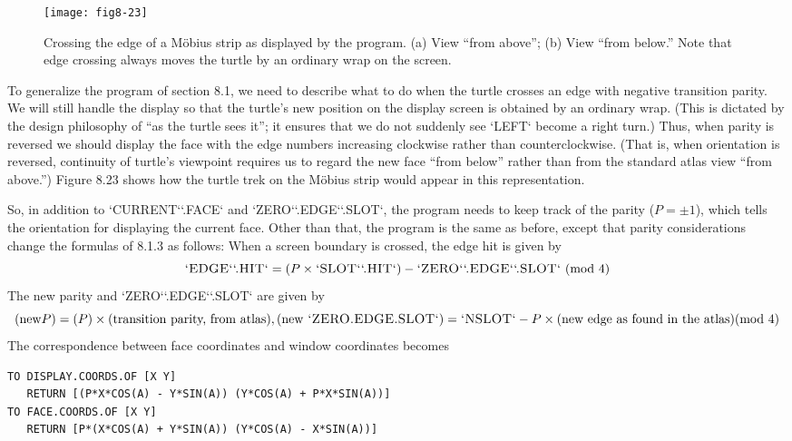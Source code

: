 \documentclass{book}
\begin{document}
\begin{figure}
\begin{center}
\texttt{[image: fig8-23]}
\caption{Crossing the edge of a M\"obius strip as displayed by the program. (a) View ``from above''; (b) View ``from below.'' Note that edge crossing always moves the turtle by an ordinary wrap on the screen.}
\end{center}
\end{figure}

To generalize the program of section 8.1, we need to describe what
to do when the turtle crosses an edge with negative transition parity.
We will still handle the display so that the turtle's new position on the
display screen is obtained by an ordinary wrap. (This is dictated by the
design philosophy of ``as the turtle sees it''; it ensures that we do not
suddenly see \textsc{`LEFT`} become a right turn.) Thus, when parity is reversed
we should display the face with the edge numbers increasing clockwise
rather than counterclockwise. (That is, when orientation is reversed,
continuity of turtle's viewpoint requires us to regard the new face ``from
below'' rather than from the standard atlas view ``from above.'') Figure
8.23 shows how the turtle trek on the M\"obius strip would appear in this
representation.

So, in addition to \textsc{`CURRENT`}\textsc{`.FACE`} and \textsc{`ZERO`}\textsc{`.EDGE`}\textsc{`.SLOT`}, the program
needs to keep track of the parity ($P = \pm 1$), which tells the orientation
for displaying the current face. Other than that, the program is the
same as before, except that parity considerations change the formulas
of 8.1.3 as follows: When a screen boundary is crossed, the edge hit is
given by
$$\text{\textsc{`EDGE`}\textsc{`.HIT`}} = (P \times \text{\textsc{`SLOT`}\textsc{`.HIT`}})- \text{\textsc{`ZERO`}\textsc{`.EDGE`}\textsc{`.SLOT`} (mod 4)}$$
The new parity and \textsc{`ZERO`}\textsc{`.EDGE`}\textsc{`.SLOT`} are given by
$$(\text{new} P) = (P) \times (\text{transition parity, from atlas}), (\text{new \textsc{`ZERO.EDGE.SLOT`}}) = \text{\textsc{`NSLOT`}}- P \times (\text{new edge as found in the atlas}) (\text{mod 4})$$
 The correspondence between face coordinates and window coordinates
becomes

\begin{verbatim}
TO DISPLAY.COORDS.OF [X Y]
   RETURN [(P*X*COS(A) - Y*SIN(A)) (Y*COS(A) + P*X*SIN(A))]
TO FACE.COORDS.OF [X Y]
   RETURN [P*(X*COS(A) + Y*SIN(A)) (Y*COS(A) - X*SIN(A))]
\end{verbatim}
\end{document}
